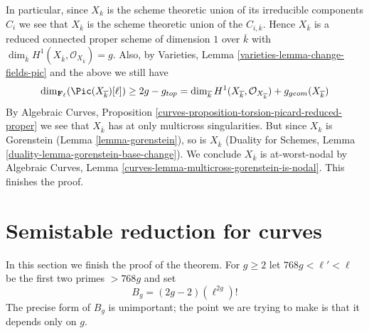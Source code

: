 \medskip\noindent
In particular, since $X_k$ is the scheme theoretic union of its
irreducible components $C_i$ we see that $X_{\overline{k}}$ is the
scheme theoretic union of the $C_{i, \overline{k}}$.
Hence $X_{\overline{k}}$ is a reduced connected proper
scheme of dimension $1$ over $\overline{k}$ with $\dim_{\overline{k}}
H^1(X_{\overline{k}}, \mathcal{O}_{X_{\overline{k}}}) = g$.
Also, by Varieties, Lemma \ref{varieties-lemma-change-fields-pic}
and the above we still have
$$
\dim_{\mathbf{F}_\ell}(\Pic(X_{\overline{k}})[\ell])
\geq 2g - g_{top} =
\dim_{\overline{k}} H^1(X_{\overline{k}}, \mathcal{O}_{X_{\overline{k}}})
+ g_{geom}(X_{\overline{k}})
$$
By Algebraic Curves, Proposition
\ref{curves-proposition-torsion-picard-reduced-proper}
we see that $X_{\overline{k}}$ has at only multicross singularities.
But since $X_k$ is Gorenstein (Lemma \ref{lemma-gorenstein}),
so is $X_{\overline{k}}$ (Duality for Schemes, Lemma
\ref{duality-lemma-gorenstein-base-change}).
We conclude $X_{\overline{k}}$ is at-worst-nodal by
Algebraic Curves, Lemma \ref{curves-lemma-multicross-gorenstein-is-nodal}.
This finishes the proof.










\section{Semistable reduction for curves}
\label{section-semistable-reduction-theorem}

\noindent
In this section we finish the proof of the theorem.
For $g \geq 2$ let $768g < \ell' < \ell$
be the first two primes $> 768g$ and set
\begin{equation}
\label{equation-bound}
B_g = (2g - 2)(\ell^{2g})!
\end{equation}
The precise form of $B_g$ is unimportant; the point we are trying
to make is that it depends only on $g$.

